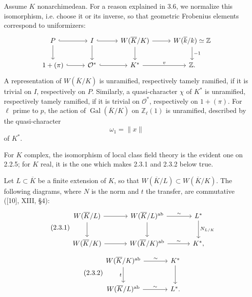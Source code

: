 \documentclass[10pt,letterpaper]{article}
\newcommand{\Z}{\mathbb Z}
\newcommand{\Gal}{\operatorname{Gal}}
\providecommand{\ab}{\mathrm{ab}}
\providecommand{\ab}{\mathrm{ab}}
\providecommand{\ab}{\mathrm{ab}}
\providecommand{\Gal}{\operatorname{Gal}}
\providecommand{\Gal}{\operatorname{Gal}}
\providecommand{\Gal}{\operatorname{Gal}}
\providecommand{\Gal}{\operatorname{Gal}}
\begin{document}
Assume \(K\) nonarchimedean. For a reason explained in 3.6, we normalize this isomorphism, i.e. choose it or its inverse, so that geometric Frobenius elements correspond to uniformizers:
\[
\begin{tikzcd}[column sep=2.7em,row sep=1.9em]
P \arrow[r,hook] \arrow[d] & I \arrow[r,hook] \arrow[d] &
W(\overline K/K) \arrow[r] \arrow[d] &
W(\overline k/k)\simeq\Z \arrow[d,"{-1}"]\\
1+(\pi) \arrow[r,hook] & \mathcal O^* \arrow[r,hook] &
K^* \arrow[r,"v"] & \Z .
\end{tikzcd}
\]
A representation of \(W(\overline K/K)\) is unramified, respectively tamely ramified, if it is trivial on \(I\), respectively on \(P\). Similarly, a quasi-character \(\chi\) of \(K^*\) is unramified, respectively tamely ramified, if it is trivial on \(\mathcal O^*\), respectively on \(1+(\pi)\). For \(\ell\) prime to \(p\), the action of \(\Gal(\overline K/K)\) on \(\Z_\ell(1)\) is unramified, described by the quasi-character
\[
\omega_1=\|x\|
\]
of \(K^*\).

For \(K\) complex, the isomorphism of local class field theory is the evident one on 2.2.5; for \(K\) real, it is the one which makes 2.3.1 and 2.3.2 below true.

Let \(L\subset\overline K\) be a finite extension of \(K\), so that \(W(\overline K/L)\subset W(\overline K/K)\). The following diagrams, where \(N\) is the norm and \(t\) the transfer, are commutative ([10], XIII, §4):
\[
\tag{2.3.1}
\begin{tikzcd}[column sep=3.3em,row sep=2.2em]
W(\overline K/L) \arrow[r] \arrow[d] &
W(\overline K/L)^{\ab} \arrow[r,"\sim"] \arrow[d] &
L^* \arrow[d,"N_{L/K}"]\\
W(\overline K/K) \arrow[r] &
W(\overline K/K)^{\ab} \arrow[r,"\sim"] &
K^* ,
\end{tikzcd}
\]
\[
\tag{2.3.2}
\begin{tikzcd}[column sep=3.5em,row sep=2.3em]
W(\overline K/K)^{\ab} \arrow[r,"\sim"] \arrow[d,"t"'] &
K^* \arrow[d]\\
W(\overline K/L)^{\ab} \arrow[r,"\sim"] &
L^* .
\end{tikzcd}
\]
\end{document}
